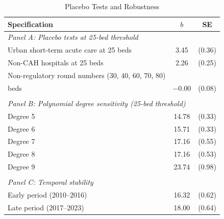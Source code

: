 \begin{table}[t]
\centering
\caption{Placebo Tests and Robustness}
\label{tab:robustness}
\begin{tabular}{lcc}
\hline\hline
Specification & $b$ & SE \\
\hline
\multicolumn{3}{l}{\textit{Panel A: Placebo tests at 25-bed threshold}} \\
Urban short-term acute care at 25 beds & 3.45 & (0.36) \\
Non-CAH hospitals at 25 beds & 2.26 & (0.25) \\
Non-regulatory round numbers (30, 40, 60, 70, 80) & & \\
\quad 30 beds & $-$0.00 & (0.08) \\
\\[-6pt]
\multicolumn{3}{l}{\textit{Panel B: Polynomial degree sensitivity (25-bed threshold)}} \\
\quad Degree 5 & 14.78 & (0.33) \\
\quad Degree 6 & 15.71 & (0.33) \\
\quad Degree 7 & 17.16 & (0.55) \\
\quad Degree 8 & 17.16 & (0.53) \\
\quad Degree 9 & 23.74 & (0.98) \\
\\[-6pt]
\multicolumn{3}{l}{\textit{Panel C: Temporal stability}} \\
Early period (2010--2016) & 16.32 & (0.62) \\
Late period (2017--2023) & 18.00 & (0.64) \\
\hline\hline
\end{tabular}
\par{}
\end{table}

